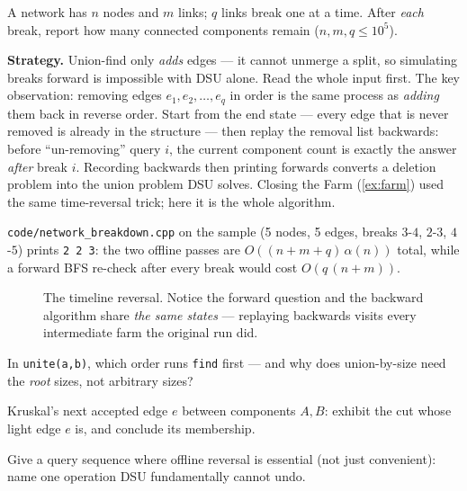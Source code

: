 \begin{example}
\label{ex:breakdown}
A network has $n$ nodes and $m$ links; $q$ links break one at a time.
After \emph{each} break, report how many connected components remain
($n, m, q \le 10^5$).
\par\smallskip
\textbf{Strategy.} Union-find only \emph{adds} edges --- it cannot
unmerge a split, so simulating breaks forward is impossible with DSU
alone. Read the whole input first. The key observation: removing edges
$e_1, e_2, \dots, e_q$ in order is the same process as \emph{adding}
them back in reverse order. Start from the end state --- every edge
that is never removed is already in the structure --- then replay the
removal list backwards: before ``un-removing'' query $i$, the current
component count is exactly the answer \emph{after} break $i$.
Recording backwards then printing forwards converts a deletion problem
into the union problem DSU solves. Closing the Farm (\ref{ex:farm})
used the same time-reversal trick; here it is the whole algorithm.
\par\smallskip
\begin{solution}
\texttt{code/network\_breakdown.cpp} on the sample (5 nodes, 5 edges,
breaks $3$-$4$, $2$-$3$, $4$-$5$) prints \texttt{2 2 3}: the two
offline passes are $O((n+m+q)\,\alpha(n))$ total, while a forward BFS
re-check after every break would cost $O(q\,(n+m))$.
\end{solution}
\end{example}
\begin{figure}[ht]\centering

\caption{The timeline reversal. Notice the forward question and the
backward algorithm share \emph{the same states} --- replaying
backwards visits every intermediate farm the original run did.}
\label{fig:farmtime}
\end{figure}

\begin{exercise}[easy]\label{exr:fu}
In \texttt{unite(a,b)}, which order runs \texttt{find} first --- and
why does union-by-size need the \emph{root} sizes, not arbitrary
sizes?
\end{exercise}
\begin{exercise}[medium]\label{exr:whichcut}
Kruskal's next accepted edge $e$ between components $A,B$: exhibit
the cut whose light edge $e$ is, and conclude its membership.
\end{exercise}
\begin{exercise}[medium]\label{exr:reverse}
Give a query sequence where offline reversal is essential (not just
convenient): name one operation DSU fundamentally cannot undo.
\end{exercise}

